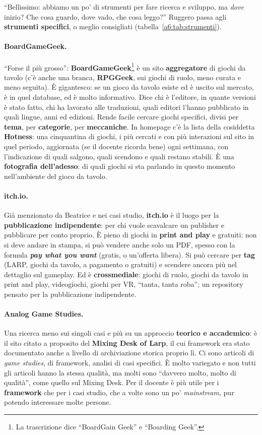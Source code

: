 ``Bellissimo: abbiamo un po' di strumenti per fare ricerca e sviluppo, ma \emph{dove}
inizio? Che cosa guardo, dove vado, che cosa leggo?'' Ruggero passa agli
\textbf{strumenti specifici}, o meglio consigliati (tabella~\ref{a6:tab:strumenti}).

\paragraph{BoardGameGeek.} ``Forse il più grosso'': \textbf{BoardGameGeek}\footnote{La
trascrizione dice ``BoardGain Geek'' e ``Boarding Geek''.} è un sito
\textbf{aggregatore} di giochi da tavolo (c'è anche una branca, \textbf{RPGGeek}, sui
giochi di ruolo, meno curata e meno seguita). È gigantesco: se un gioco da tavolo
esiste ed è uscito sul mercato, è in quel database, ed è molto informativo. Dice chi è
l'editore, in quante versioni è stato fatto, chi ha lavorato alle traduzioni, quali
editori l'hanno pubblicato in quali lingue, anni ed edizioni. Rende facile cercare
giochi specifici, divisi per \textbf{tema}, per \textbf{categorie}, per
\textbf{meccaniche}. In homepage c'è la lista della cosiddetta \textbf{Hotness}: una
cinquantina di giochi, i più cercati e con più interazioni sul sito in quel periodo,
aggiornata (se il docente ricorda bene) ogni settimana, con l'indicazione di quali
salgono, quali scendono e quali restano stabili. È una \textbf{fotografia dell'adesso}:
di quali giochi si sta parlando in questo momento nell'ambiente del gioco da tavolo.

\paragraph{itch.io.} Già menzionato da Beatrice e nei casi studio, \textbf{itch.io} è
il luogo per la \textbf{pubblicazione indipendente}: per chi vuole scavalcare un
publisher e pubblicare per conto proprio. È pieno di giochi in \textbf{print and play}
e gratuiti: non si deve andare in stampa, si può vendere anche solo un PDF, spesso con
la formula \textbf{\emph{pay what you want}} (gratis, o un'offerta libera). Si può
cercare per \textbf{tag} (LARP, giochi da tavolo, a pagamento o gratuiti) e scendere
ancora più nel dettaglio sul gameplay. Ed è \textbf{crossmediale}: giochi di ruolo,
giochi da tavolo in print and play, videogiochi, giochi per VR, ``tanta, tanta roba'';
un repository pensato per la pubblicazione indipendente.

\paragraph{Analog Game Studies.} Una ricerca meno sui singoli casi e più su un approccio
\textbf{teorico e accademico}: è il sito citato a proposito del \textbf{Mixing Desk of
Larp}, il cui framework era stato documentato anche a livello di archiviazione storica
proprio lì. Ci sono articoli di \emph{game studies}, di framework, analisi di casi
specifici. È molto variegato e non tutti gli articoli hanno la stessa qualità, ma molti
sono ``davvero molto, molto di qualità'', come quello sul Mixing Desk. Per il docente è
più utile per i \textbf{framework} che per i casi studio, che a volte sono un po'
\emph{mainstream}, pur potendo interessare molte persone.

